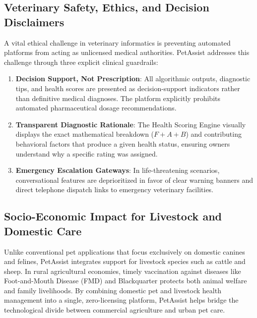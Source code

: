 \documentclass[conference]{IEEEtran}
\begin{document}
\subsection{Veterinary Safety, Ethics, and Decision Disclaimers}
A vital ethical challenge in veterinary informatics is preventing automated platforms from acting as unlicensed medical authorities. PetAssist addresses this challenge through three explicit clinical guardrails:
\begin{enumerate}
    \item \textbf{Decision Support, Not Prescription}: All algorithmic outputs, diagnostic tips, and health scores are presented as decision-support indicators rather than definitive medical diagnoses. The platform explicitly prohibits automated pharmaceutical dosage recommendations.
    \item \textbf{Transparent Diagnostic Rationale}: The Health Scoring Engine visually displays the exact mathematical breakdown ($F + A + B$) and contributing behavioral factors that produce a given health status, ensuring owners understand why a specific rating was assigned.
    \item \textbf{Emergency Escalation Gateways}: In life-threatening scenarios, conversational features are deprioritized in favor of clear warning banners and direct telephone dispatch links to emergency veterinary facilities.
\end{enumerate}

\subsection{Socio-Economic Impact for Livestock and Domestic Care}
Unlike conventional pet applications that focus exclusively on domestic canines and felines, PetAssist integrates support for livestock species such as cattle and sheep. In rural agricultural economies, timely vaccination against diseases like Foot-and-Mouth Disease (FMD) and Blackquarter protects both animal welfare and family livelihoods. By combining domestic pet and livestock health management into a single, zero-licensing platform, PetAssist helps bridge the technological divide between commercial agriculture and urban pet care.
\end{document}
